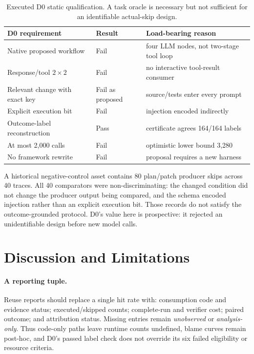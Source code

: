 \documentclass[letterpaper]{article} %
\begin{document}
\begin{table}[h]
\centering
\small
\setlength{\tabcolsep}{3pt}
\begin{tabular}{p{}p{}p{}}
\toprule
\textbf{D0 requirement} & \textbf{Result} & \textbf{Load-bearing reason} \\
\midrule
Native proposed workflow & Fail & four LLM nodes, not two-stage tool loop \\
Response/tool $2\times2$ & Fail & no interactive tool-result consumer \\
Relevant change with exact key & Fail as proposed & source/tests enter every prompt \\
Explicit execution bit & Fail & injection encoded indirectly \\
Outcome-label reconstruction & Pass & certificate agrees 164/164 labels \\
At most 2,000 calls & Fail & optimistic lower bound 3,280 \\
No framework rewrite & Fail & proposal requires a new harness \\
\bottomrule
\end{tabular}
\caption{Executed D0 static qualification. A task oracle is necessary but not
sufficient for an identifiable actual-skip design.}
\label{tab:d0}
\end{table}

A historical negative-control asset contains 80 plan/patch producer skips
across 40 traces. All 40 comparators were non-discriminating: the changed
condition did not change the producer output being compared, and the schema
encoded injection rather than an explicit execution bit. Those records do not
satisfy the outcome-grounded protocol. D0's value here is prospective: it
rejected an unidentifiable design before new model calls.

\section{Discussion and Limitations}

\paragraph{A reporting tuple.}
Reuse reports should replace a single hit rate with: consumption code and
evidence status; executed/skipped counts; complete-run and verifier cost;
paired outcome; and attribution status. Missing entries remain
\emph{unobserved} or \emph{analysis-only}. Thus code-only paths leave runtime
counts undefined, blame curves remain post-hoc, and D0's passed label check
does not override its six failed eligibility or resource criteria.
\end{document}
